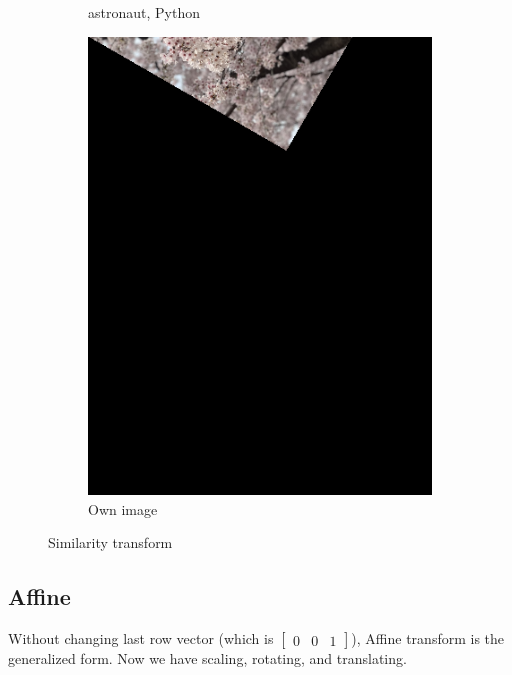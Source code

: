 \documentclass{article}
\begin{document}
\begin{figure}[!ht]
\begin{subfigure}{0.267\textwidth}
        \caption{astronaut, Python}
    \end{subfigure}
    \begin{subfigure}{0.2\textwidth}
        \includegraphics[width=\textwidth]{./fig/similarity_cb.png}
        \caption{Own image}
    \end{subfigure}
    \caption{Similarity transform}
\end{figure}

\subsection{Affine}
Without changing last row vector (which is $\begin{bmatrix}0 & 0 & 1\end{bmatrix}$), Affine transform is the generalized form.
Now we have scaling, rotating, and translating.  
\end{document}
